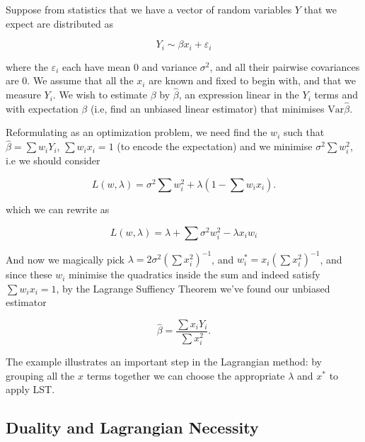 \documentclass[11pt]{scrartcl}
\begin{document}
\begin{example}

Suppose from statistics that we have a vector of random variables $Y$ that we expect are distributed as 

\[ Y_i \sim \beta x_i + \varepsilon_i \]

where the $\varepsilon_i$ each have mean 0 and variance $\sigma^2$, and all their pairwise covariances are 0. We assume that all the $x_i$ are known and fixed to begin with, and that we measure $Y_i$. We wish to estimate $\beta$ by $\hat{\beta}$, an expression linear in the $Y_i$ terms and with expectation $\beta$ (i.e, find an unbiased linear estimator) that minimises $\text{Var} \hat{\beta}$. 

Reformulating as an optimization problem, we need find the $w_i$ such that $\hat{\beta} = \sum w_i Y_i$, $\sum w_i x_i = 1$ (to encode the expectation) and we minimise $\sigma^2 \sum w_i^2$, i.e we should consider

\[ L(w, \lambda) = \sigma^2 \sum w_i^2 + \lambda \left( 1 - \sum w_i x_i\right). \]

which we can rewrite as

\[ L(w, \lambda) = \lambda + \sum \sigma^2 w_i^2 - \lambda x_i w_i\]

And now we magically pick $\lambda = 2\sigma^2\left(\sum x_i^2 \right)^{-1}$, and $w_i^* = x_i \left(\sum x_i^2 \right)^{-1}$, and since these $w_i$ minimise the quadratics inside the sum and indeed satisfy $\sum w_i x_i = 1$, by the Lagrange Suffiency Theorem we've found our unbiased estimator 

\[\hat{\beta} = \frac{\sum x_i Y_i}{\sum x_i^2}.\]

\end{example}

The example illustrates an important step in the Lagrangian method: by grouping all the $x$ terms together we can choose the appropriate $\lambda$ and $x^*$ to apply LST.

\begin{problem}
\end{problem}

\subsection{Duality and Lagrangian Necessity}
\end{document}
